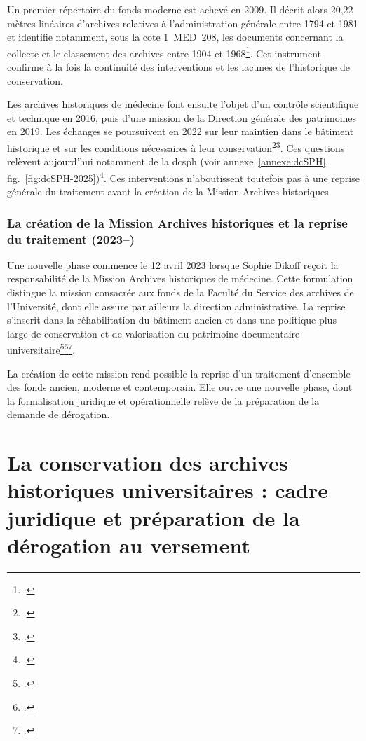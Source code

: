 Un premier répertoire du fonds moderne est achevé en 2009. Il décrit alors 20,22 mètres linéaires d'archives relatives à l'administration générale entre 1794 et 1981 et identifie notamment, sous la cote 1~MED~208, les documents concernant la collecte et le classement des archives entre 1904 et 1968\footcite{Perroud2009FondsModerne}. Cet instrument confirme à la fois la continuité des interventions et les lacunes de l'historique de conservation.

Les archives historiques de médecine font ensuite l'objet d'un contrôle scientifique et technique en 2016, puis d'une mission de la Direction générale des patrimoines en 2019. Les échanges se poursuivent en 2022 sur leur maintien dans le bâtiment historique et sur les conditions nécessaires à leur conservation\footcite{AHFMReunionMars2022}\footcite{AHFMReunionJuillet2023}. Ces questions relèvent aujourd'hui notamment de la \gls{dcsph} (voir annexe~\ref{annexe:dcSPH}, fig.~\ref{fig:dcSPH-2025})\footcite{UMDCSPH2025}. Ces interventions n'aboutissent toutefois pas à une reprise générale du traitement avant la création de la Mission Archives historiques.

\subsection{La création de la Mission Archives historiques et la reprise du traitement (2023--)}

Une nouvelle phase commence le 12 avril 2023 lorsque Sophie Dikoff reçoit la responsabilité de la Mission Archives historiques de médecine. Cette formulation distingue la mission consacrée aux fonds de la Faculté du Service des archives de l'Université, dont elle assure par ailleurs la direction administrative. La reprise s'inscrit dans la réhabilitation du bâtiment ancien et dans une politique plus large de conservation et de valorisation du patrimoine documentaire universitaire\footcite{UMPatrimoineArchives}\footcite{UMServicesPatrimoine}\footcite{AHFMFeuilleRoute2025_2029}.

La création de cette mission rend possible la reprise d'un traitement d'ensemble des fonds ancien, moderne et contemporain. Elle ouvre une nouvelle phase, dont la formalisation juridique et opérationnelle relève de la préparation de la demande de dérogation.

\chapter{La conservation des archives historiques universitaires :
	cadre juridique et préparation de la dérogation au versement}
\label{chap:cadre-juridique-derogation}

